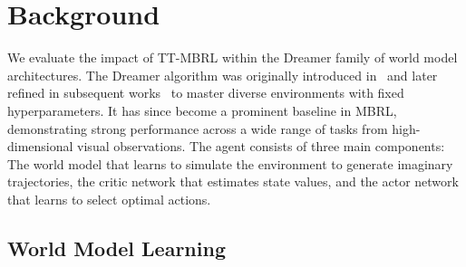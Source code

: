 \section{Background}

We evaluate the impact of TT-MBRL within the Dreamer family of world model architectures. The Dreamer algorithm was originally introduced in~\citet{hafner2019dream} and later refined in subsequent works~\citep{hafner2020mastering, hafner2023mastering} to master diverse environments with fixed hyperparameters. It has since become a prominent baseline in MBRL, demonstrating strong performance across a wide range of tasks from high-dimensional visual observations. The agent consists of three main components: The world model that learns to simulate the environment to generate imaginary trajectories, the critic network that estimates state values, and the actor network that learns to select optimal actions.

\subsection{World Model Learning}

